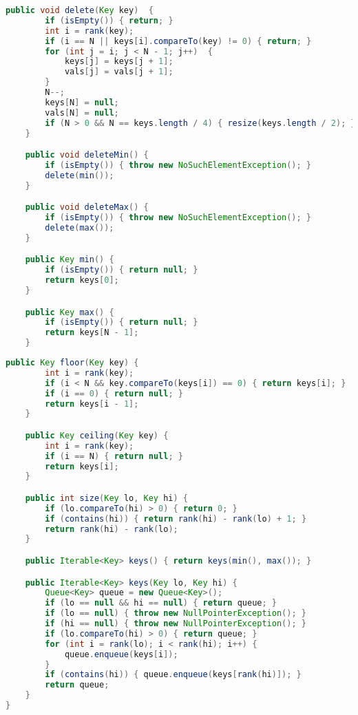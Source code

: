 \documentclass[8pt,a4paper,compress]{beamer}
\begin{document}
\begin{frame}[fragile]
\pause

\begin{lstlisting}[language=Java,style=focusin]
    public void delete(Key key)  {
        if (isEmpty()) { return; }
        int i = rank(key);
        if (i == N || keys[i].compareTo(key) != 0) { return; }
        for (int j = i; j < N - 1; j++)  {
            keys[j] = keys[j + 1];
            vals[j] = vals[j + 1];
        }
        N--;
        keys[N] = null; 
        vals[N] = null;
        if (N > 0 && N == keys.length / 4) { resize(keys.length / 2); }
    } 

    public void deleteMin() {
        if (isEmpty()) { throw new NoSuchElementException(); }
        delete(min());
    }

    public void deleteMax() {
        if (isEmpty()) { throw new NoSuchElementException(); }
        delete(max());
    }

    public Key min() {
        if (isEmpty()) { return null; }
        return keys[0]; 
    }

    public Key max() {
        if (isEmpty()) { return null; }
        return keys[N - 1];
    }
\end{lstlisting}
\end{frame}

\begin{frame}[fragile]
\pause

\begin{lstlisting}[language=Java,style=focusin]
    public Key floor(Key key) {
        int i = rank(key);
        if (i < N && key.compareTo(keys[i]) == 0) { return keys[i]; }
        if (i == 0) { return null; }
        return keys[i - 1];
    }

    public Key ceiling(Key key) {
        int i = rank(key);
        if (i == N) { return null; }
        return keys[i];
    }

    public int size(Key lo, Key hi) {
        if (lo.compareTo(hi) > 0) { return 0; }
        if (contains(hi)) { return rank(hi) - rank(lo) + 1; }
        return rank(hi) - rank(lo);
    }

    public Iterable<Key> keys() { return keys(min(), max()); }

    public Iterable<Key> keys(Key lo, Key hi) {
        Queue<Key> queue = new Queue<Key>(); 
        if (lo == null && hi == null) { return queue; }
        if (lo == null) { throw new NullPointerException(); }
        if (hi == null) { throw new NullPointerException(); }
        if (lo.compareTo(hi) > 0) { return queue; }
        for (int i = rank(lo); i < rank(hi); i++) {
            queue.enqueue(keys[i]);
        }
        if (contains(hi)) { queue.enqueue(keys[rank(hi)]); }
        return queue; 
    }    
}
\end{lstlisting}
\end{frame}
\end{document}
